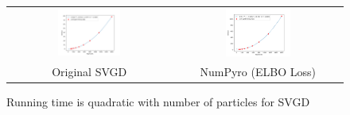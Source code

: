 \begin{figure}[!htbp]
    \centering
    \begin{tabular}{@{}cc@{}}
            \includegraphics[width=0.40\textwidth]{figs/toy-timing-particles.png} & \includegraphics[width=0.40\textwidth]{figs/toy-timing-particles-numpyro-elbo.png}\\
        \small Original SVGD & NumPyro (ELBO Loss) \\
    \end{tabular}
    \caption{Running time is quadratic with number of particles for SVGD}
    \label{fig:timingparticles}
\end{figure}
